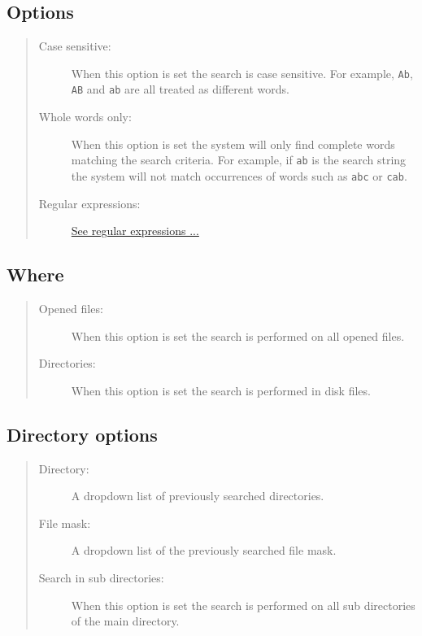 \subsection{Options}

\begin{quote}
  \begin{footnotesize}
    \begin{description}
      \item[Case sensitive:]
        When this option is set the search is case sensitive.
        For example, \texttt{Ab}, \texttt{AB} and \texttt{ab}
        are all treated as different words.
      \item[Whole words only:]
        When this option is set the system will only find complete
        words matching the search criteria. For example, if
        \texttt{ab} is the search string the system will not match
        occurrences of words such as \texttt{abc} or \texttt{cab}.
      \item[Regular expressions:]
        \href{\#working\_regularexpressions}{See regular expressions ...}
    \end{description}
  \end{footnotesize}
\end{quote}


\subsection{Where}

\begin{quote}
  \begin{footnotesize}
    \begin{description}
      \item[Opened files:]
        When this option is set the search is performed on all opened files.
      \item[Directories:]
        When this option is set the search is performed in disk files.
    \end{description}
  \end{footnotesize}
\end{quote}


\subsection{Directory options}

\begin{quote}
  \begin{footnotesize}
    \begin{description}
      \item[Directory:]
        A dropdown list of previously searched directories.
      \item[File mask:]
        A dropdown list of the previously searched file mask.
      \item[Search in sub directories:]
        When this option is set the search is performed on all sub
        directories of the main directory.
    \end{description}
  \end{footnotesize}
\end{quote}


